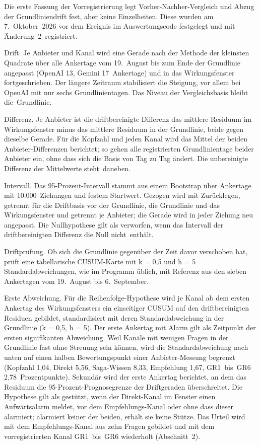 \documentclass[11pt]{article}
\begin{document}
Die erste Fassung der Vorregistrierung legt Vorher-Nachher-Vergleich und Abzug der Grundliniendrift fest, aber keine Einzelheiten. Diese wurden am 7.~Oktober~2026 vor dem Ereignis im Auswertungscode festgelegt und mit Änderung~2~\mbox{registriert.}

Drift. Je Anbieter und Kanal wird eine Gerade nach der Methode der kleinsten Quadrate über alle Ankertage vom 19.~August bis zum Ende der Grundlinie angepasst (OpenAI 13, Gemini 17~Ankertage) und in das Wirkungsfenster fortgeschrieben. Der längere Zeitraum stabilisiert die Steigung, vor allem bei OpenAI mit nur sechs Grundlinientagen. Das Niveau der Vergleichsbasis bleibt die~\mbox{Grundlinie.}

Differenz. Je Anbieter ist die driftbereinigte Differenz das mittlere Residuum im Wirkungsfenster minus das mittlere Residuum in der Grundlinie, beide gegen dieselbe Gerade. Für die Kopfzahl und jeden Kanal wird das Mittel der beiden Anbieter-Differenzen berichtet; so gehen alle registrierten Grundlinientage beider Anbieter ein, ohne dass sich die Basis von Tag zu Tag ändert. Die unbereinigte Differenz der Mittelwerte steht~\mbox{daneben.}

Intervall. Das 95-Prozent-Intervall stammt aus einem Bootstrap über Ankertage mit 10.000~Ziehungen und festem Startwert. Gezogen wird mit Zurücklegen, getrennt für die Driftbasis vor der Grundlinie, die Grundlinie und das Wirkungsfenster und getrennt je Anbieter; die Gerade wird in jeder Ziehung neu angepasst. Die Nullhypothese gilt als verworfen, wenn das Intervall der driftbereinigten Differenz die Null nicht~\mbox{enthält.}

Driftprüfung. Ob sich die Grundlinie gegenüber der Zeit davor verschoben hat, prüft eine tabellarische CUSUM-Karte mit k = 0,5 und h = 5 Standardabweichungen, wie im Programm üblich, mit Referenz aus den sieben Ankertagen vom 19.~August bis 6.~September.

Erste Abweichung. Für die Reihenfolge-Hypothese wird je Kanal ab dem ersten Ankertag des Wirkungsfensters ein einseitiger CUSUM auf den driftbereinigten Residuen gebildet, standardisiert mit deren Standardabweichung in der Grundlinie (k = 0,5, h = 5). Der erste Ankertag mit Alarm gilt als Zeitpunkt der ersten signifikanten Abweichung. Weil Kanäle mit wenigen Fragen in der Grundlinie fast ohne Streuung sein können, wird die Standardabweichung nach unten auf einen halben Bewertungspunkt einer Anbieter-Messung begrenzt (Kopfzahl 1,04, Direkt 5,56, Saga-Wissen 8,33, Empfehlung 1,67, GR1~bis~GR6 2,78~Prozentpunkte). Sekundär wird der erste Ankertag berichtet, an dem das Residuum die 95-Prozent-Prognosegrenze der Driftgeraden überschreitet. Die Hypothese gilt als gestützt, wenn der Direkt-Kanal im Fenster einen Aufwärtsalarm meldet, vor dem Empfehlungs-Kanal oder ohne dass dieser alarmiert; alarmiert keiner der beiden, erhält sie keine Stütze. Das Urteil wird mit dem Empfehlungs-Kanal aus zehn Fragen gebildet und mit dem vorregistrierten Kanal GR1~bis~GR6 wiederholt (Abschnitt~2).
\end{document}
